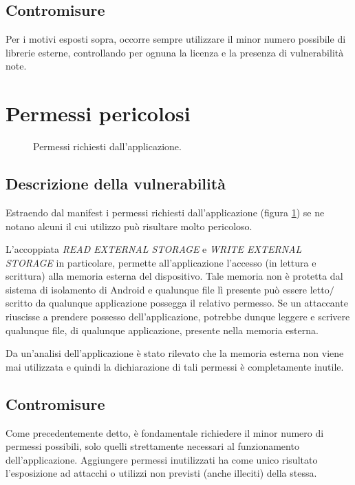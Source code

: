 \subsection{Contromisure}
Per i motivi esposti sopra, occorre sempre utilizzare il minor numero possibile di librerie esterne, controllando per ognuna la licenza e la presenza di vulnerabilità note.

\section{Permessi pericolosi}

\begin{figure}[h]
	\centering 
	\caption{Permessi richiesti dall'applicazione.}
	\label{fig:permessi}
\end{figure}

\subsection{Descrizione della vulnerabilità}

Estraendo dal manifest i permessi richiesti dall'applicazione (figura \ref{fig:permessi}) se ne notano alcuni il cui utilizzo può risultare molto pericoloso. 

L'accoppiata \emph{READ EXTERNAL STORAGE} e \emph{WRITE EXTERNAL STORAGE} in particolare, permette all'applicazione l'accesso (in lettura e scrittura) alla memoria esterna del dispositivo. Tale memoria non è protetta dal sistema di isolamento di Android e qualunque file lì presente può essere letto$/$scritto da qualunque applicazione possegga il relativo permesso. Se un attaccante riuscisse a prendere possesso dell'applicazione, potrebbe dunque leggere e scrivere qualunque file, di qualunque applicazione, presente nella memoria esterna.

Da un'analisi dell'applicazione è stato rilevato che la memoria esterna non viene mai utilizzata e quindi la dichiarazione di tali permessi è completamente inutile.

\subsection{Contromisure}
Come precedentemente detto, è fondamentale richiedere il minor numero di permessi possibili, solo quelli strettamente necessari al funzionamento dell'applicazione. Aggiungere permessi inutilizzati ha come unico risultato l'esposizione ad attacchi o utilizzi non previsti (anche illeciti) della stessa.

